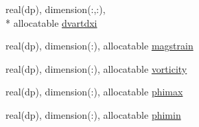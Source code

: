 \begin{DoxyCompactItemize}
\item 
real(dp), dimension(\-:,\-:), \\*
allocatable \hyperlink{classvariables_aac67db3d7658de3c9bcab981064055dc}{dvartdxi}
\item 
real(dp), dimension(\-:), allocatable \hyperlink{classvariables_a3ba4f7a23c9d0f8c379b4004b2926235}{magstrain}
\item 
real(dp), dimension(\-:), allocatable \hyperlink{classvariables_a9d202bc1b4e97e3af595e8e4baaa9bee}{vorticity}
\item 
real(dp), dimension(\-:), allocatable \hyperlink{classvariables_afe1c9a217b537eb8cef36f9e26e8c789}{phimax}
\item 
real(dp), dimension(\-:), allocatable \hyperlink{classvariables_a73f00dce58a2515ab0c87e5ff205479c}{phimin}
\end{DoxyCompactItemize}



